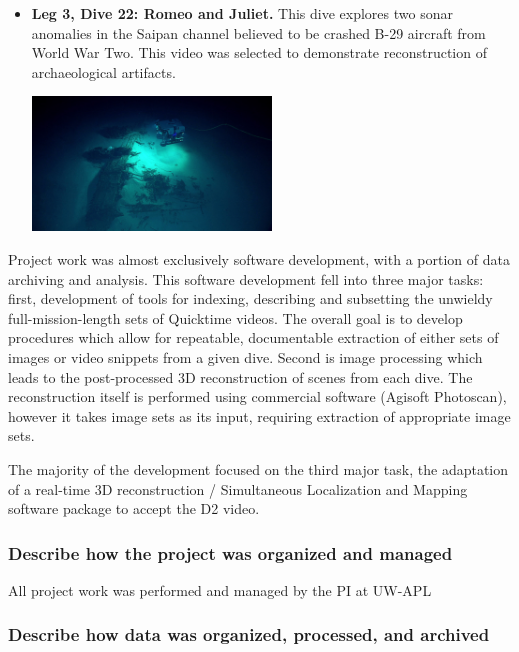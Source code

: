 \documentclass[letterpaper,12pt]{article}
\begin{document}
\begin{itemize}
    \item \textbf{Leg 3, Dive 22: Romeo and Juliet.}  This dive explores two sonar anomalies in the Saipan channel believed to be crashed B-29 aircraft from World War Two.  This video was selected to demonstrate reconstruction of archaeological artifacts.
    
    \includegraphics[width=0.5\textwidth]{images/EX1605L3_DIVE22_highlight.jpg}
    
\end{itemize}


Project work was almost exclusively software development, with a portion of data archiving and analysis.   This software development fell into three major tasks:   first, development of tools for indexing, describing and subsetting the unwieldy full-mission-length sets of Quicktime videos.   The overall goal is to develop procedures which allow for repeatable, documentable extraction of either sets of images or video snippets from a given dive.  Second is image processing which leads to the post-processed 3D reconstruction of scenes from each dive.   The reconstruction itself is performed using commercial software (Agisoft Photoscan), however it takes image sets as its input, requiring extraction of appropriate image sets.

The majority of the development focused on the third major task, the adaptation of a real-time 3D reconstruction / Simultaneous Localization and Mapping software package to accept the D2 video.

\subsubsection*{Describe how the project was organized and managed}

All project work was performed and managed by the PI at UW-APL

\subsubsection*{Describe how data was organized, processed, and archived}
\end{document}
